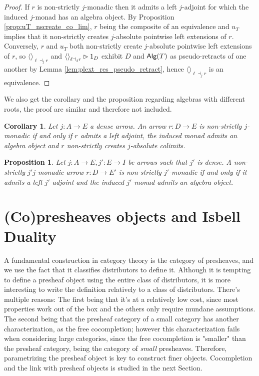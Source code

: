 \documentclass[10pt,a4paper]{article}
\newcommand{\cat}[1]{\textcat{#1}}
\newcommand{\textcat}[1]{{\normalfont\textsf{#1}}}
\newcommand{\plext}{\mathbin{{\rhd}\mathclap{\mspace{-17.5mu}\cdot}}}
\newcommand{\tp}[1]{\langle#1\rangle}
\newcommand{\unit}{{\tp{}}}
\DeclareMathOperator{\Alg}{\cat{Alg}}
\theoremstyle{plain}
\newtheorem{proposition}[theorem]{Proposition}
\newtheorem{corollary}[theorem]{Corollary}
\theoremstyle{definition}
\theoremstyle{remark}
\begin{document}
\begin{proof}
    If $r$ is non-strictly $j$-monadic then it admits a left $j$-adjoint for which the induced $j$-monad has an algebra object. By Proposition \ref{prop:uT_nscreate_co_lim}, $r$ being the composite of an equivalence and $u_T$ implies that it non-strictly creates $j$-absolute pointwise left extensions of $r$.\\
    Conversely, $r$ and $u_T$ both non-strictly create $j$-absolute pointwise left extensions of $r$, so $\unit_{\ell\dashv_jr}$ and $\unit_{\ell\dashv_jr}\plext 1_D$ exhibit $D$ and $\Alg(T)$ as pseudo-retracts of one another by Lemma \ref{lem:plext_res_pseudo_retract}, hence $\unit_{\ell\dashv_jr}$ is an equivalence.
\end{proof}

We also get the corollary and the proposition regarding algebras with different roots, the proof are similar and therefore not included.

\begin{corollary}
    Let $j : A \to E$ a dense arrow. An arrow $r : D \to E$ is non-strictly $j$-monadic if and only if $r$ admits a left adjoint, the induced monad admits an algebra object and $r$ non-strictly creates $j$-absolute colimits.
\end{corollary}

\begin{proposition}
    Let $j : A \to E, j' : E \to I$ be arrows such that $j'$ is dense. A non-strictly $j'j$-monadic arrow $r : D \to E'$ is non-strictly $j'$-monadic if and only if it admits a left $j'$-adjoint and the induced $j'$-monad admits an algebra object.
\end{proposition}


\section{(Co)presheaves objects and Isbell Duality}
\label{sec:presheaves}

A fundamental construction in category theory is the category of presheaves, and we use the fact that it classifies distributors to define it. Although it is tempting to define a presheaf object using the entire class of distributors, it is more interesting to write the definition relatively to a class of distributors. There's multiple reasons: The first being that it's at a relatively low cost, since most properties work out of the box and the others only require mundane assumptions. The second being that the presheaf category of a small category has another characterization, as the free cocompletion; however this characterization fails when considering large categories, since the free cocompletion is "smaller" than the presheaf category, being the category of \textit{small} presheaves. Therefore, parametrizing the presheaf object is key to construct finer objects. Cocompletion and the link with presheaf objects is studied in the next Section.
\end{document}
